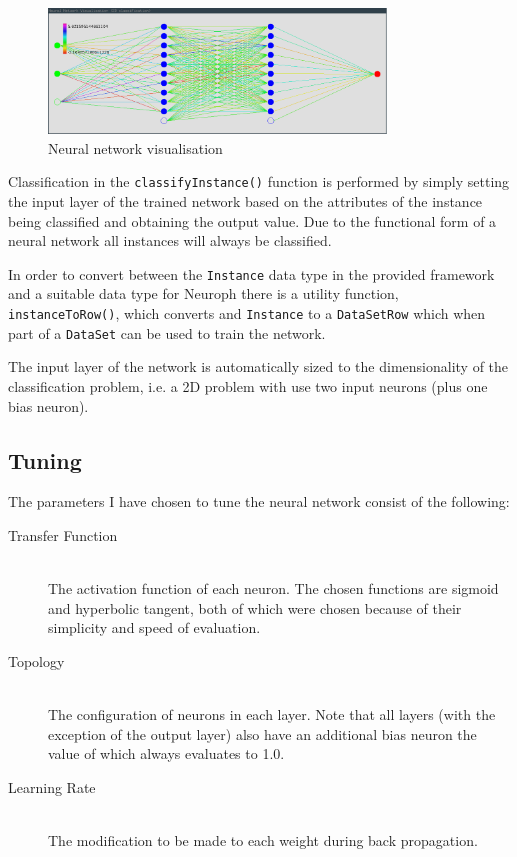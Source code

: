 \documentclass[a4paper]{article}
\begin{document}
\begin{figure}[h!]
  \centering
  \includegraphics[width=0.8\textwidth]{graphics/nn_vis.eps}
  \caption{Neural network visualisation}
  \label{fig:nn_vis}
\end{figure}

Classification in the \texttt{classifyInstance()} function is performed by
simply setting the input layer of the trained network based on the attributes of
the instance being classified and obtaining the output value. Due to the
functional form of a neural network all instances will always be classified.

In order to convert between the \texttt{Instance} data type in the provided
framework and a suitable data type for Neuroph there is a utility function,
\texttt{instanceToRow()}, which converts and \texttt{Instance} to a
\texttt{DataSetRow} which when part of a \texttt{DataSet} can be used to train
the network.

The input layer of the network is automatically sized to the dimensionality of
the classification problem, i.e. a 2D problem with use two input neurons (plus
one bias neuron).

\subsection{Tuning}
\label{sec:nn_tuning}

The parameters I have chosen to tune the neural network consist of the
following:

\begin{description}
  \item[Transfer Function] \hfill \\
    The activation function of each neuron. The chosen functions are sigmoid and
    hyperbolic tangent, both of which were chosen because of their simplicity
    and speed of evaluation.
  \item[Topology] \hfill \\
    The configuration of neurons in each layer.
    Note that all layers (with the exception of the output layer)  also have an
    additional bias neuron the value of which always evaluates to 1.0.
  \item[Learning Rate] \hfill \\
    The modification to be made to each weight during back propagation.
\end{description}
\end{document}
